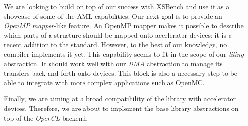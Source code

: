 We are looking to build on top of our success with XSBench and use it as a
showcase of some of the AML capabilities. Our next goal is to provide an
\emph{OpenMP mapper}-like feature. An OpenMP mapper makes it possible to
describe which parts of a structure should be mapped onto
accelerator devices; it is a recent addition to the standard. However, to the best
of our knowledge, no compiler implements it yet. This capability seems to fit in the
scope of our \emph{tiling} abstraction. It should work well with our \emph{DMA}
abstraction to manage its transfers back and forth onto devices. This block is also a
necessary step to be able to integrate with more complex applications such as OpenMC.

Finally, we are aiming at a broad compatibility of the library with accelerator devices.
Therefore, we are about to implement the base library abstractions on top of the \emph{OpenCL}
backend.

